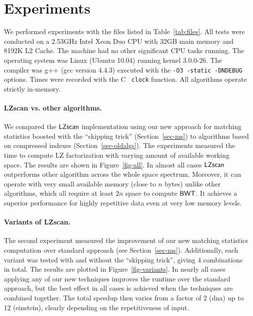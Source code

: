 \documentclass[runningheads]{llncs}
\def\BWT{\mbox{\rm L}}
\def\BWT{\mbox{\rm {\sf BWT}}}
\def\LZSCAN{\mbox{\sf LZscan}}
\begin{document}
\clearpage

\section{Experiments}
\label{sec-experiments}

We performed experiments with 
the files listed in Table~\ref{tab:files}.  All tests were conducted
on a 2.53GHz Intel Xeon Duo CPU with 32GB main memory and 8192K L2
Cache. The machine had no other significant CPU tasks running. The
operating system was Linux (Ubuntu 10.04) running kernel 3.0.0-26. The
compiler was g++ (gcc version 4.4.3) executed with the {\tt -O3
  -static -DNDEBUG} options. Times were recorded with the C {\tt
  clock} function. All algorithms operate strictly in-memory.

\paragraph{LZscan vs. other algorithms.} We compared the $\LZSCAN$
implementation using our new approach for matching statistics boosted
with the ``skipping trick'' (Section~\ref{sec-ms}) to algorithms based
on compressed indexes (Section~\ref{sec-oldalgs}). The experiments measured
the time to compute LZ factorization with varying amount of available
working space. The results are shown in Figure~\ref{fig-all}. In almost
all cases $\LZSCAN$ outperforms other algorithm across the whole space
spectrum. Moreover, it can operate with very small available memory (close
to $n$ bytes) unlike other algorithms, which all require at least $2n$ space
to compute $\BWT$. It achieves a superior performance for highly
repetitive data even at very low memory levels.

\paragraph{Variants of LZscan.}
The second experiment measured the improvement of our new matching
statistics computation over standard approach (see Section~\ref{sec-ms}).
Additionally, each variant was tested with and without the ``skipping trick'',
giving 4 combinations in total. The results are plotted in
Figure~\ref{fig-variants}. In nearly all cases applying any of our new
techniques improves the runtime over the standard approach, but the best
effect in all cases is achieved when the techniques are combined together.
The total speedup then varies from a factor of 2 (dna) up to 12 (einstein),
clearly depending on the repetitiveness of input.
\end{document}
